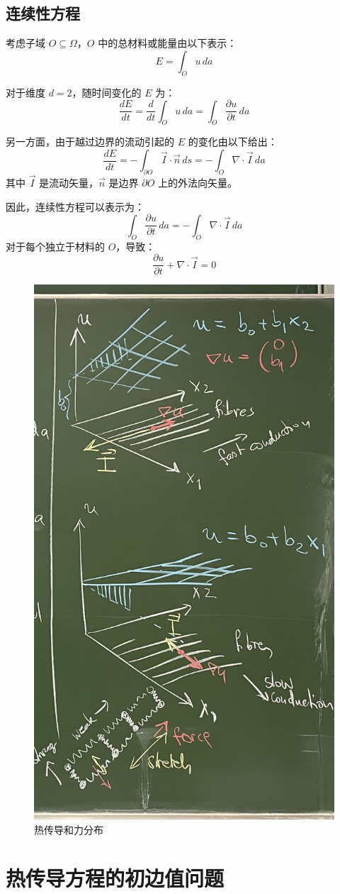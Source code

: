 \documentclass{ctexart}
\begin{document}
\subsection*{连续性方程}

考虑子域 \( O \subseteq \Omega \)，\( O \) 中的总材料或能量由以下表示：
\[ E = \int_O u \, da \]

对于维度 \( d = 2 \)，随时间变化的 \( E \) 为：
\[ \frac{dE}{dt} = \frac{d}{dt} \int_O u \, da = \int_O \frac{\partial u}{\partial t} \, da \]

另一方面，由于越过边界的流动引起的 \( E \) 的变化由以下给出：
\[ \frac{dE}{dt} = -\int_{\partial O} \vec{I} \cdot \vec{n} \, ds = -\int_O \nabla \cdot \vec{I} \, da \]
其中 \( \vec{I} \) 是流动矢量，\( \vec{n} \) 是边界 \( \partial O \) 上的外法向矢量。

因此，连续性方程可以表示为：
\[ \int_O \frac{\partial u}{\partial t} \, da = -\int_O \nabla \cdot \vec{I} \, da \]
对于每个独立于材料的 \( O \)，导致：
\[ \frac{\partial u}{\partial t} + \nabla \cdot \vec{I} = 0 \]

\begin{figure}
    \centering
    \includegraphics[width=0.5\linewidth]{IMG_2734.jpeg}
    \caption{热传导和力分布}
    \label{fig:enter-label}
\end{figure}

\newpage
\date{15.11.2023.PDE}


\section*{热传导方程的初边值问题}
\end{document}
